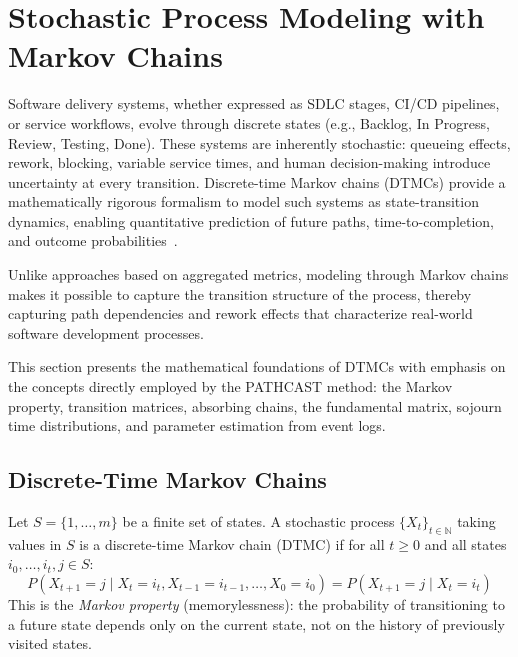 \section{Stochastic Process Modeling with Markov Chains}
\label{sec:markov}

Software delivery systems, whether expressed as SDLC stages, CI/CD
pipelines, or service workflows, evolve through discrete states (e.g.,
Backlog, In Progress, Review, Testing, Done). These systems are
inherently stochastic: queueing effects, rework, blocking, variable
service times, and human decision-making introduce uncertainty at every
transition. Discrete-time Markov chains (DTMCs) provide a mathematically
rigorous formalism to model such systems as state-transition dynamics,
enabling quantitative prediction of future paths, time-to-completion,
and outcome probabilities~\cite{Spedicato2017, Haggstrom2002}.

Unlike approaches based on aggregated metrics, modeling through Markov chains makes it possible to capture the transition structure of the process, thereby capturing path dependencies and rework effects that characterize real-world software development processes.

This section presents the mathematical foundations of DTMCs with emphasis
on the concepts directly employed by the PATHCAST method: the
Markov property, transition matrices, absorbing chains, the fundamental
matrix, sojourn time distributions, and parameter estimation from event
logs.


\subsection{Discrete-Time Markov Chains}
\label{sec:dtmc}

\begin{definition}
\label{def:dtmc}
Let $S = \{1, \ldots, m\}$ be a finite set of states. A stochastic
process $\{X_t\}_{t \in \mathbb{N}}$ taking values in $S$ is a
discrete-time Markov chain (DTMC) if for all $t \geq 0$ and all states
$i_0, \ldots, i_t, j \in S$:
\begin{equation}
\label{eq:markov-property}
P(X_{t+1} = j \mid X_t = i_t, X_{t-1} = i_{t-1}, \ldots, X_0 = i_0)
= P(X_{t+1} = j \mid X_t = i_t)
\end{equation}
This is the \emph{Markov property} (memorylessness): the probability of
transitioning to a future state depends only on the current state, not
on the history of previously visited states.
\end{definition}

